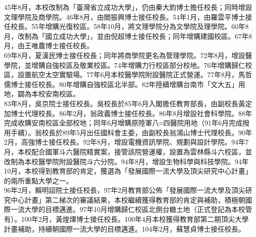 45年8月，本校改制為「臺灣省立成功大學」，仍由秦大鈞博士擔任校長；同時增設文理學院及商學院。46年8月，由閻振興博士接任校長。54年1月，由羅雲平博士接任校長。55年增購光復校區。58年10月，將文理學院分為文學院及理學院。60年8月，改制為「國立成功大學」，並由倪超博士接任校長；同年增購建國校區。67年8月，由王唯農博士接任校長。\\

69年8月，夏漢民博士接任校長；同年將商學院更名為管理學院。72年8月，增設醫學院，並增購自強校區及敬業校區。74年增購力行校區部分校地。76年增購歸仁校區，設置航空太空實驗場。77年6月本校醫學院附設醫院正式營運。77年8月，馬哲儒博士接任校長。80年增購自強校區北半部。82年陸續增購台南市「文大五」用地，闢為本校安南校區。\\

83年8月，吳京院士接任校長。吳校長於85年6月入閣擔任教育部長，由副校長黃定加博士代理校長。86年2月，翁政義博士接任校長。86年8月增設社會科學院。88年完成收購安南校區全部校地；同年6月增購原陸軍八○四醫院用地（91年6月完成撥用手續）。翁校長於89年5月出任國科會主委，由副校長翁鴻山博士代理校長。90年2月，高強博士接任校長。92年8月，增設電機資訊學院、規劃與設計學院。94年7月，本校配合國軍斗六醫院精實案，接管該院營運權，設置為雲林縣斗六校區，並改制為本校醫學院附設醫院斗六分院。94年8月，增設生物科學與科技學院。94年10月，本校得到教育部的肯定，獲選為「發展國際一流大學及頂尖研究中心計畫」的兩所重點大學之一。\\

96年2月，賴明詔院士接任校長，97年2月教育部公佈「發展國際一流大學及頂尖研究中心計畫」第二梯次的審議結果，本校繼續獲得教育部的肯定與補助，積極朝國際一流大學的目標邁進。97年10月增購歸仁校區北側台糖土地（正式登記為本校管有）。100年2月，黃煌煇博士接任校長。100年4月本校獲得教育部第二期頂尖大學計畫補助，持續朝國際一流大學的目標邁進。104年2月，蘇慧貞博士接任校長。

